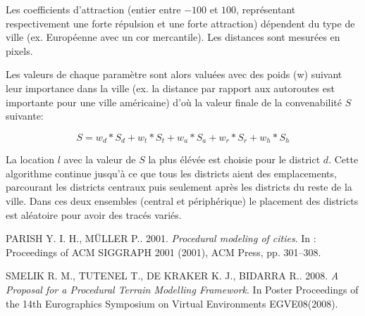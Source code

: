 \documentclass[11pt]{article}
\begin{document}
Les coefficients d'attraction (entier entre $-100$ et $100$, représentant respectivement une forte répulsion et une forte attraction) dépendent du type de ville (ex. Européenne avec un cor mercantile).
Les distances sont mesurées en pixels.

Les valeurs de chaque paramètre sont alors valuées avec des poids (w) suivant leur importance dans la ville (ex. la distance par rapport aux autoroutes est importante pour une ville américaine) d'où la valeur finale de la convenabilité $S$ suivante:

\begin{equation}
S = w_d \ast S_d + w_t \ast S_t + w_a \ast S_a + w_r \ast S_r + w_h \ast S_h
\end{equation}

La location $l$ avec la valeur de $S$ la plus élévée est choisie pour le district $d$. Cette algorithme continue jusqu'à ce que tous les districts aient des emplacements, parcourant les districts centraux puis seulement après les districts du reste de la ville. Dans ces deux ensembles (central et périphérique) le placement des districts est aléatoire pour avoir des tracés variés.

\begin{thebibliography}{2} 

\label{Parish and Muller (2001)}
PARISH Y. I. H., MÜLLER P.. 2001.
\textit{Procedural modeling of cities}.
In : Proceedings of ACM SIGGRAPH 2001 (2001), ACM Press, pp. 301–308.

SMELIK R. M., TUTENEL T., DE KRAKER K. J., BIDARRA R.. 2008.
\textit{A Proposal for a Procedural Terrain Modelling Framework}.
In Poster Proceedings of the 14th Eurographics Symposium on Virtual Environments EGVE08(2008).

\end{thebibliography}
\end{document}
